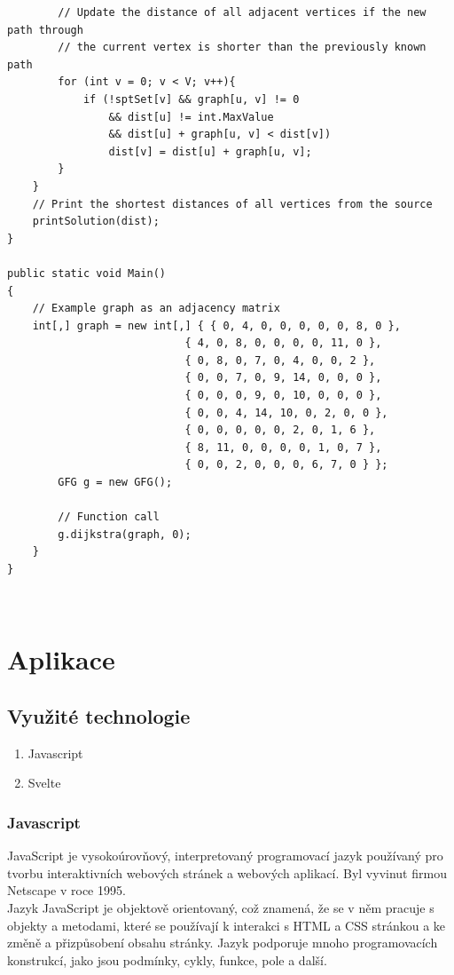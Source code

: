 \documentclass[12pt, titlepage, a4paper]{article}
\begin{document}
\begin{lstlisting}
        // Update the distance of all adjacent vertices if the new path through
        // the current vertex is shorter than the previously known path
        for (int v = 0; v < V; v++){
            if (!sptSet[v] && graph[u, v] != 0
                && dist[u] != int.MaxValue
                && dist[u] + graph[u, v] < dist[v])
                dist[v] = dist[u] + graph[u, v];
        }
    }
    // Print the shortest distances of all vertices from the source
    printSolution(dist);
}

public static void Main()
{
    // Example graph as an adjacency matrix
    int[,] graph = new int[,] { { 0, 4, 0, 0, 0, 0, 0, 8, 0 },
                            { 4, 0, 8, 0, 0, 0, 0, 11, 0 },
                            { 0, 8, 0, 7, 0, 4, 0, 0, 2 },
                            { 0, 0, 7, 0, 9, 14, 0, 0, 0 },
                            { 0, 0, 0, 9, 0, 10, 0, 0, 0 },
                            { 0, 0, 4, 14, 10, 0, 2, 0, 0 },
                            { 0, 0, 0, 0, 0, 2, 0, 1, 6 },
                            { 8, 11, 0, 0, 0, 0, 1, 0, 7 },
                            { 0, 0, 2, 0, 0, 0, 6, 7, 0 } };
        GFG g = new GFG();
 
        // Function call
        g.dijkstra(graph, 0);
    }
}
\end{lstlisting}
~\cite{GeeksforGeeks: Dijkstra}
\clearpage
\section{Aplikace}
\subsection{Využité technologie}
\begin{enumerate}
    \item Javascript
    \item Svelte
\end{enumerate}
\subsubsection{Javascript}
JavaScript je vysokoúrovňový, interpretovaný programovací jazyk používaný pro tvorbu interaktivních 
webových stránek a webových aplikací. Byl vyvinut firmou Netscape v roce 1995.
\\

Jazyk JavaScript je objektově orientovaný, což znamená, že se v něm pracuje s objekty a metodami, 
které se používají k interakci s HTML a CSS stránkou a ke změně a přizpůsobení obsahu stránky. 
Jazyk podporuje mnoho programovacích konstrukcí, jako jsou podmínky, cykly, funkce, pole a další.
\\
\end{document}
